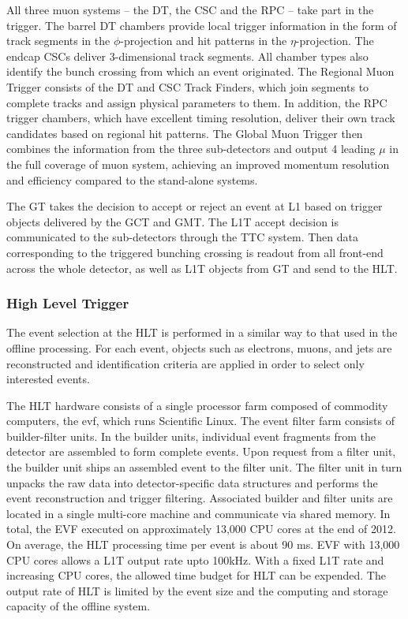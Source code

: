 All three muon systems – the DT, the CSC and the RPC – take part in the trigger. The barrel DT chambers provide local trigger information in the form of track segments in the $\phi$-projection and hit patterns in the $\eta$-projection. The endcap CSCs deliver 3-dimensional track segments. All chamber types also identify the bunch crossing from which an event originated. The Regional Muon Trigger consists of the DT and CSC Track Finders, which join segments to complete tracks and assign physical parameters to them. In addition, the RPC trigger chambers, which have excellent timing resolution, deliver their own track candidates based on regional hit patterns. The Global Muon Trigger then combines the information from the three sub-detectors and output 4 leading $\mu$ in the full coverage of muon system, achieving an improved momentum resolution and efficiency compared to the stand-alone systems.

The GT takes the decision to accept or reject an event at L1 based on trigger objects delivered by the GCT and GMT. The L1T accept decision is communicated to the sub-detectors through the TTC system. Then data corresponding to the triggered bunching crossing is readout from all front-end across the whole detector, as well as L1T objects from GT and send to the HLT.



\subsubsection{High Level Trigger}

The event selection at the HLT is performed in a similar way to that used in the offline processing. For each event, objects such as electrons, muons, and jets are reconstructed and identification criteria are applied in order to select only interested events.

The HLT hardware consists of a single processor farm composed of commodity computers, the \acrfull{evf}, which runs Scientific Linux. The event filter farm consists of builder-filter units. In the builder units, individual event fragments from the detector are assembled to form complete events. Upon request from a filter unit, the builder unit ships an assembled event to the filter unit. The filter unit in turn unpacks the raw data into detector-specific data structures and performs the event reconstruction and trigger filtering. Associated builder and filter units are located in a single multi-core machine and communicate via shared memory. In total, the EVF executed on approximately 13,000 CPU cores at the end of 2012. On average, the HLT processing time per event is about 90 ms. EVF with 13,000 CPU cores allows a L1T output rate upto 100kHz. With a fixed L1T rate and increasing CPU cores, the allowed time budget for HLT can be expended. The output rate of HLT is limited by the event size and the computing and storage capacity of the offline system.

